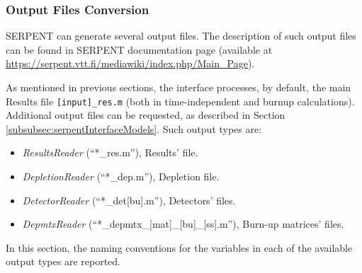 \subsubsection{Output Files Conversion}
\label{subsubsec:serpentInterfaceOutputConversion}
SERPENT can generate several output files. The description of 
such output files can be found in SERPENT documentation page  
(available at \url{https://serpent.vtt.fi/mediawiki/index.php/Main_Page}).

As mentioned in previous sections, the interface processes, by default, the
main Results file \texttt{[input]\_res.m} (both in time-independent  and burnup calculations).
Additional output files can be requested, as described in Section 
\ref{subsubsec:serpentInterfaceModels}. Such output types are:
\begin{itemize}
   \item  \textit{ResultsReader} (``*\_res.m''), Results’ file.
   \item  \textit{DepletionReader} (``*\_dep.m''), Depletion file.
   \item \textit{DetectorReader}  (``*\_det[bu].m''), Detectors’ files.
   \item  \textit{DepmtxReader} (``*\_depmtx\_[mat]\_[bu]\_[ss].m''), Burn-up matrices’ files.
\end{itemize}

In this section, the naming conventions for the variables in each of the available output types 
are reported.\\

